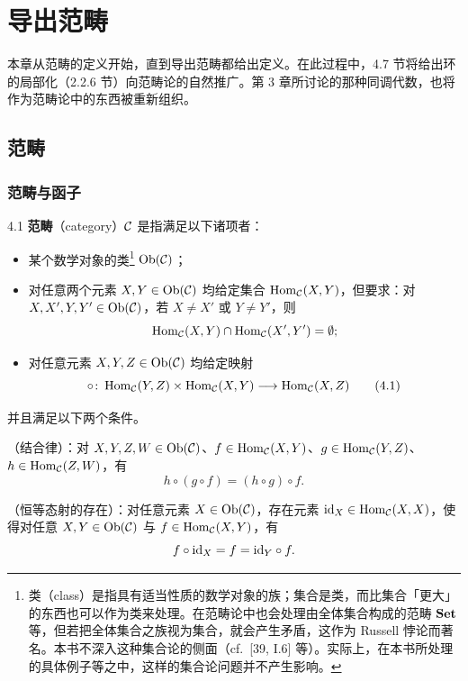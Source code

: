 \chapter{导出范畴}

本章从范畴的定义开始，直到导出范畴都给出定义。在此过程中，4.7 节将给出环的局部化（2.2.6 节）向范畴论的自然推广。第 3 章所讨论的那种同调代数，也将作为范畴论中的东西被重新组织。

\section{范畴}

\subsection{范畴与函子}

\begin{definition}{4.1}
\textbf{范畴}（category）$\mathcal{C}$ 是指满足以下诸项者：
\begin{itemize}
  \item 某个数学对象的类\footnote{类（class）是指具有适当性质的数学对象的族；集合是类，而比集合「更大」的东西也可以作为类来处理。在范畴论中也会处理由全体集合构成的范畴 $\mathbf{Set}$ 等，但若把全体集合之族视为集合，就会产生矛盾，这作为 Russell 悖论而著名。本书不深入这种集合论的侧面（cf.\ [39, I.6] 等）。实际上，在本书所处理的具体例子等之中，这样的集合论问题并不产生影响。} $\operatorname{Ob}(\mathcal{C})$；
  \item 对任意两个元素 $X,Y\in\operatorname{Ob}(\mathcal{C})$ 均给定集合 $\operatorname{Hom}_{\mathcal{C}}(X,Y)$，但要求：对 $X,X',Y,Y'\in\operatorname{Ob}(\mathcal{C})$，若 $X\neq X'$ 或 $Y\neq Y'$，则
        \[ \operatorname{Hom}_{\mathcal{C}}(X,Y)\cap\operatorname{Hom}_{\mathcal{C}}(X',Y')=\emptyset; \]
  \item 对任意元素 $X,Y,Z\in\operatorname{Ob}(\mathcal{C})$ 均给定映射
        \begin{equation}
          \circ\colon\operatorname{Hom}_{\mathcal{C}}(Y,Z)\times\operatorname{Hom}_{\mathcal{C}}(X,Y)\longrightarrow\operatorname{Hom}_{\mathcal{C}}(X,Z) \tag{4.1}
        \end{equation}
\end{itemize}
并且满足以下两个条件。
\end{definition}

（结合律）：对 $X,Y,Z,W\in\operatorname{Ob}(\mathcal{C})$、$f\in\operatorname{Hom}_{\mathcal{C}}(X,Y)$、$g\in\operatorname{Hom}_{\mathcal{C}}(Y,Z)$、$h\in\operatorname{Hom}_{\mathcal{C}}(Z,W)$，有
\[ h\circ(g\circ f)=(h\circ g)\circ f. \]

（恒等态射的存在）：对任意元素 $X\in\operatorname{Ob}(\mathcal{C})$，存在元素 $\mathrm{id}_X\in\operatorname{Hom}_{\mathcal{C}}(X,X)$，使得对任意 $X,Y\in\operatorname{Ob}(\mathcal{C})$ 与 $f\in\operatorname{Hom}_{\mathcal{C}}(X,Y)$，有
\[ f\circ\mathrm{id}_X=f=\mathrm{id}_Y\circ f. \]

